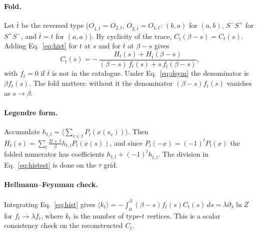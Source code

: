 \documentclass[a4paper,12pt]{article}
\newcommand{\aver}[1]{\ensuremath{\langle#1\rangle}}
\renewcommand{\t}{\ensuremath{\tau}}
\begin{document}
\paragraph{Fold.} Let $\bar t$ be the reversed type ($O_{1,\bar t}=O_{2,t}$,
$O_{2,\bar t}=O_{1,t}$: $(b,a)$ for $(a,b)$, $S^-S^+$ for $S^+S^-$, and $\bar t=t$ for
$(a,a)$). By cyclicity of the trace, $C_{\bar t}(\beta-s)=C_t(s)$. Adding
Eq.~\eqref{eq:hist} for $t$ at $s$ and for $\bar t$ at $\beta-s$ gives
\begin{equation}
  C_t(s)=-\,\frac{H_t(s)+H_{\bar t}(\beta-s)}{(\beta-s)\,f_t(s)+s\,f_{\bar t}(\beta-s)},
  \label{eq:histest}
\end{equation}
with $f_{\bar t}=0$ if $\bar t$ is not in the catalogue. Under Eq.~\eqref{eq:dsym} the
denominator is $\beta f_t(s)$. The fold matters: without it the denominator
$(\beta-s)f_t(s)$ vanishes as $s\to\beta$.

\paragraph{Legendre form.} Accumulate $h_{t,l}=\aver{\sum_{v\in t}P_l(x(s_v))}$. Then
$H_t(s)=\sum_l\frac{2l+1}{\beta}h_{t,l}P_l(x(s))$, and since $P_l(-x)=(-1)^lP_l(x)$ the
folded numerator has coefficients $h_{t,l}+(-1)^lh_{\bar t,l}$. The division in
Eq.~\eqref{eq:histest} is done on the $\t$ grid.

\paragraph{Hellmann--Feynman check.} Integrating Eq.~\eqref{eq:hist} gives
$\aver{k_t}=-\int_0^\beta(\beta-s)f_t(s)C_t(s)\,ds=\lambda\partial_\lambda\ln Z$ for
$f_t\to\lambda f_t$, where $k_t$ is the number of type-$t$ vertices. This is a scalar
consistency check on the reconstructed $C_t$.
\end{document}
